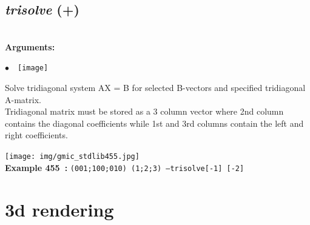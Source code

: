 \documentclass[a4paper,10.5pt,twoside]{book}
\def\comma{\discretionary{,}{}{,}}
\newcommand{\Cb}[1]{\textcolor{cb}{#1}}
\begin{document}
\subsection{\emph{trisolve} (+)}\vspace*{-0.7em}
~\\\textbf{\Cb{Arguments: }}\begin{flushleft}
{\small \Cb{\hspace*{0.5cm}$\bullet$~~\texttt{[image]}}}\end{flushleft}
Solve tridiagonal system AX = B for selected B-vectors and specified tridiagonal A-matrix.
~\\Tridiagonal matrix must be stored as a 3 column vector{\comma} where 2nd column contains the
diagonal coefficients{\comma} while 1st and 3rd columns contain the left and right coefficients.
\begin{center}\texttt{[image: img/gmic\_stdlib455.jpg]}\\
{\footnotesize \textbf{Example 455~:} \texttt{(0{\comma}0{\comma}1;1{\comma}0{\comma}0;0{\comma}1{\comma}0) (1;2;3) --trisolve[-1] [-2]}}
\end{center}
\section{3d rendering}
\end{document}
